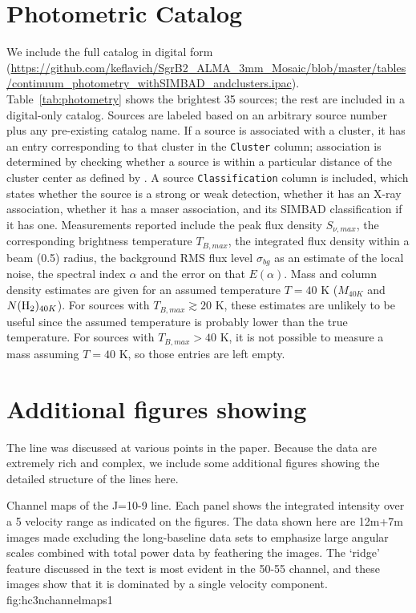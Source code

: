 \documentclass[twocolumn]{aastex61}
\begin{document}
\section{Photometric Catalog}
\label{sec:catalog}
We include the full catalog in digital form
(\url{https://github.com/keflavich/SgrB2_ALMA_3mm_Mosaic/blob/master/tables/continuum_photometry_withSIMBAD_andclusters.ipac}).
Table~\ref{tab:photometry} shows
the brightest 35 sources; the rest are included in a digital-only catalog.
Sources are labeled based on an arbitrary source
number plus any pre-existing catalog name.  If a source is associated with a cluster,
it has an entry corresponding to that cluster in the \texttt{Cluster} column;
association is determined by checking whether a source is within a particular distance
of the cluster center as defined by \citet{Schmiedeke2016a}.  A source
\texttt{Classification} column is included, which states whether the source
is a strong or weak detection, whether it has an X-ray association, whether it
has a maser association, and its SIMBAD classification if it has one.
Measurements reported include the peak flux density $S_{\nu,max}$, the
corresponding brightness temperature $T_{B,max}$, the integrated flux density
within a beam (0.5\arcsec) radius, the background RMS flux level $\sigma_{bg}$
as an estimate of the local noise, the spectral index $\alpha$ and the error on
that $E(\alpha)$.  Mass and column density estimates are given for an assumed
temperature $T=40$ K ($M_{40K}$ and $N(\textrm{H}_{2})_{40K}$).  For sources with
$T_{B,max}\gtrsim20$ K, these estimates are unlikely to be useful since the
assumed temperature is probably lower than the true temperature.
For sources with $T_{B,max}>40$ K, it is not possible to measure a mass
assuming $T=40$ K, so those entries are left empty.



\section{Additional figures showing \cyanoacetylene}
\label{sec:hc3nfigures}
The \cyanoacetylene line was discussed at various points in the paper.  Because
the data are extremely rich and complex,  we include some additional figures
showing the detailed
structure of the lines here.

{Channel maps of the \cyanoacetylene J=10-9 line.  Each panel shows the integrated
intensity over a 5 \kms velocity range as indicated on the figures.
The data shown here are 
12m+7m images made excluding the long-baseline data sets to emphasize
large angular scales
combined with total power
data by feathering the images.
The `ridge' feature  discussed in the text is most evident in the 50-55 \kms
channel, and these images show that it is dominated by a single velocity
component.
}
{fig:hc3nchannelmaps}{1}{\textwidth}
\end{document}

